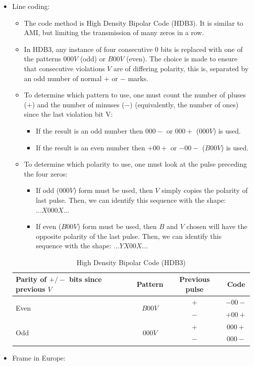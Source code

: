 \documentclass[../main.tex]{subfiles}
\begin{document}
\begin{itemize}
	\item {
		Line coding:
		\begin{itemize}
			\item The code method is High Density Bipolar Code (HDB3). It is similar to AMI, but limiting the transmission of many zeros in a row.
			\item In HDB3, any instance of four consecutive 0 bits is replaced with one of the patterns $000V$ (odd) or $B00V$ (even). The choice is made to ensure that consecutive violations $V$ are of differing polarity, this is, separated by an odd number of normal $+$ or $-$ marks.
			\item {
				To determine which pattern to use, one must count the number of pluses ($+$) and the number of minuses ($-$) (equivalently, the number of ones) since the last violation bit V:
				\begin{itemize}
					\item If the result is an odd number then $000-$ or $000+$ ($000V$) is used.
					\item If the result is an even number then $+00+$ or $-00-$ ($B00V$) is used.
				\end{itemize}
			}
			\item {
				To determine which polarity to use, one must look at the pulse preceding the four zeros:
				\begin{itemize}
					\item If odd ($000V$) form must be used, then $V$ simply copies the polarity of last pulse. Then, we can identify this sequence with the shape: $\ldots X000X \ldots$
					\item If even ($B00V$) form must be used, then $B$ and $V$ chosen will have the opposite polarity of the last pulse. Then, we can identify this sequence with the shape: $\ldots YX00X \ldots$
				\end{itemize}
			}
		\end{itemize}
		\begin{table}[H]
			\centering
			\begin{tabular}{|l|c|c|c|}
				\hline
				Parity of $+/-$ bits since previous $V$	& Pattern					& Previous pulse	& Code \\
				\hline
				\multirow{2}{*}{Even}					& \multirow{2}{*}{$B00V$}	& $+$				& $-00-$ \\
				\cline{3-4}
														&							& $-$				& $+00+$ \\
				\hline
				\multirow{2}{*}{Odd}					& \multirow{2}{*}{$000V$}	& $+$				& $000+$ \\
				\cline{3-4}
														&							& $-$				& $000-$ \\
				\hline
			\end{tabular}
			\caption{
				\label{tab:HDB3}
				High Density Bipolar Code (HDB3)
			}
		\end{table}
	}
	\item {
		Frame in Europe:

}
\end{itemize}
\end{document}
